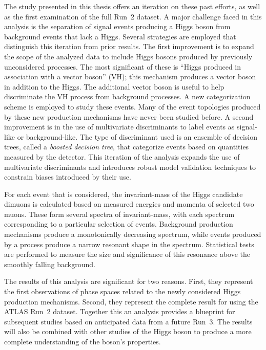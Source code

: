 The study presented in this thesis offers an iteration on these past efforts, as well as the first examination of the full Run~2 dataset.
A major challenge faced in this analysis is the separation of signal events producing a Higgs boson from background events that lack a Higgs.
Several strategies are employed that distinguish this iteration from prior results.
The first improvement is to expand the scope of the analyzed data to include Higgs bosons produced by previously unconsidered processes.
The most significant of these is ``Higgs produced in association with a vector boson'' (VH); this mechanism produces a vector boson in addition to the Higgs.
The additional vector boson is useful to help discriminate the VH process from background processes.
A new categorization scheme is employed to study these events.
Many of the event topologies produced by these new production mechanisms have never been studied before.
A second improvement is in the use of multivariate discriminants to label events as signal-like or background-like. 
The type of discriminant used is an ensemble of decision trees, called a \emph{boosted decision tree}, that categorize events based on quantities measured by the detector.
This iteration of the analysis expands the use of multivariate discriminants and introduces robust model validation techniques to constrain biases introduced by their use.

For each event that is considered, the invariant-mass of the Higgs candidate dimuons is calculated based on measured energies and momenta of selected two muons.
These form several spectra of invariant-mass, with each spectrum corresponding to a particular selection of events.
Background production mechanisms produce a monotonically decreasing spectrum, while events produced by a \hmm process produce a narrow resonant shape in the spectrum.
Statistical tests are performed to measure the size and significance of this resonance above the smoothly falling background.

The results of this analysis are significant for two reasons.
First, they represent the first observations of phase spaces related to the newly considered Higgs production mechanisms.
Second, they represent the complete result for \hmm using the ATLAS Run~2 dataset.
Together this an analysis provides a blueprint for subsequent studies based on anticipated data from a future Run~3.
The results will also be combined with other studies of the Higgs boson to produce a more complete understanding of the boson's properties.

